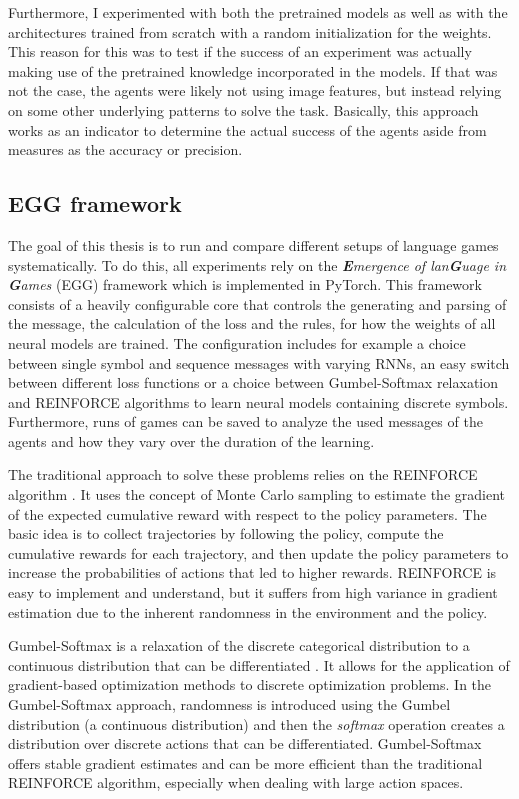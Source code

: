 Furthermore, I experimented with both the pretrained models as well as with the architectures trained from scratch with a random initialization for the weights.
This reason for this was to test if the success of an experiment was actually making use of the pretrained knowledge incorporated in the models.
If that was not the case, the agents were likely not using image features, but instead relying on some other underlying patterns to solve the task.
Basically, this approach works as an indicator to determine the actual success of the agents aside from measures as the accuracy or precision.

\subsection{EGG framework}
The goal of this thesis is to run and compare different setups of language games systematically.
To do this, all experiments rely on the \emph{\textbf{E}mergence of lan\textbf{G}uage in \textbf{G}ames} (EGG) framework \citep{Kharitonov2019} which is implemented in PyTorch.
This framework consists of a heavily configurable core that controls the generating and parsing of the message, the calculation of the loss and the rules, for how the weights of all neural models are trained.
The configuration includes for example a choice between single symbol and sequence messages with varying RNNs, an easy switch between different loss functions or a choice between Gumbel-Softmax relaxation and REINFORCE algorithms to learn neural models containing discrete symbols.
Furthermore, runs of games can be saved to analyze the used messages of the agents and how they vary over the duration of the learning.

The traditional approach to solve these problems relies on the REINFORCE algorithm \citep{Williams1992}. It uses the concept of Monte Carlo sampling to estimate the gradient of the expected cumulative reward with respect to the policy parameters. The basic idea is to collect trajectories by following the policy, compute the cumulative rewards for each trajectory, and then update the policy parameters to increase the probabilities of actions that led to higher rewards. REINFORCE is easy to implement and understand, but it suffers from high variance in gradient estimation due to the inherent randomness in the environment and the policy.

Gumbel-Softmax is a relaxation of the discrete categorical distribution to a continuous distribution that can be differentiated \citep{Jang2016}. It allows for the application of gradient-based optimization methods to discrete optimization problems. In the Gumbel-Softmax approach, randomness is introduced using the Gumbel distribution (a continuous distribution) and then the \emph{softmax} operation creates a distribution over discrete actions that can be differentiated.
Gumbel-Softmax offers stable gradient estimates and can be more efficient than the traditional REINFORCE algorithm, especially when dealing with large action spaces.

